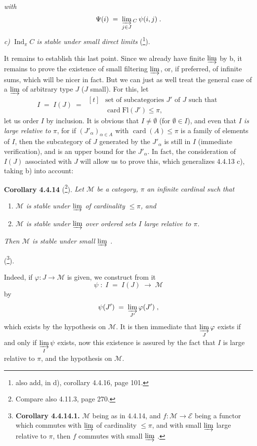 \documentclass[11pt]{article}
\newcommand{\printedpage}[1]{\marginpar{\footnotesize p.~#1}}
\newcommand{\msp}[1]{\marginpar{\footnotesize [#1]}}
\newcommand{\Ind}{\operatorname{Ind}}
\newcommand{\card}{\operatorname{card}}
\newcommand{\Fl}{\mathrm{Fl}}
\begin{document}
\printedpage{24}

\textit{with}
\[
\Psi(i) \;=\; \varinjlim_{j\in J}{}_{C}\,\psi(i,j)\;.
\]
\textit{c)} $\Ind_\pi C$ \textit{is stable under small direct limits} (\footnote{also add, in d), corollary 4.4.16, page 101.}).

It remains to establish this last point. Since we already have finite $\varinjlim$ by b, it remains to prove the existence of small filtering $\varinjlim$, or, if preferred, of infinite sums, which will be nicer in fact. But
\msp{page 97}
we can just as well treat the general case of a $\varinjlim$ of arbitrary type $J$ ($J$ small). For this, let
\[
I \;=\; I(J) \;=\; \begin{aligned}[t]
&\text{set of subcategories } J' \text{ of } J \text{ such that}\\
&\card\Fl(J')\leqslant\pi,
\end{aligned}
\]
let us order $I$ by inclusion. It is obvious that $I\neq\emptyset$ (for $\emptyset\in I$), and even that $I$ \textit{is large relative to} $\pi$, for if $(J'_\alpha)_{\alpha\in A}$ with $\card(A)\leqslant\pi$ is a family of elements of $I$, then the subcategory of $J$ generated by the $J'_\alpha$ is still in $I$ (immediate verification), and is an upper bound for the $J'_\alpha$. In fact, the consideration of $I(J)$ associated with $J$ will allow us to prove this, which generalizes 4.4.13 c), taking b) into account:

\textbf{Corollary 4.4.14} (\footnote{Compare also 4.11.3, page 270.}). \textit{Let $\mathcal{M}$ be a category, $\pi$ an infinite cardinal such that}
\begin{enumerate}
\item[a)] \textit{$\mathcal{M}$ is}
\msp{page 98}
\textit{stable under $\varinjlim$ of cardinality $\leqslant\pi$, and}
\item[b)] \textit{$\mathcal{M}$ is stable under $\varinjlim$ over ordered sets $I$ large relative to $\pi$.}
\end{enumerate}
\textit{Then $\mathcal{M}$ is stable under small $\varinjlim$ .}

(\footnote{\textbf{Corollary 4.4.14.1.} $\mathcal{M}$ being as in 4.4.14, and $f:\mathcal{M}\longrightarrow\mathcal{E}$ being a functor which commutes with $\varinjlim$ of cardinality $\leqslant\pi$, and with small $\varinjlim$ large relative to $\pi$, then $f$ commutes with small $\varinjlim$ .}).

Indeed, if $\varphi:J\longrightarrow\mathcal{M}$ is given, we construct from it
\[
\psi\;:\;I\;=\;I(J)\;\longrightarrow\;\mathcal{M}
\]
by
\[
\psi(J')\;=\;\varinjlim_{J'}\varphi(J')\;,
\]
which exists by the hypothesis on $\mathcal{M}$. It is then immediate that $\varinjlim\limits_{J}\varphi$ exists if and only if $\varinjlim\limits_{I}\psi$ exists, now this existence is assured by the fact that $I$ is large relative to $\pi$, and the hypothesis on $\mathcal{M}$.
\end{document}
